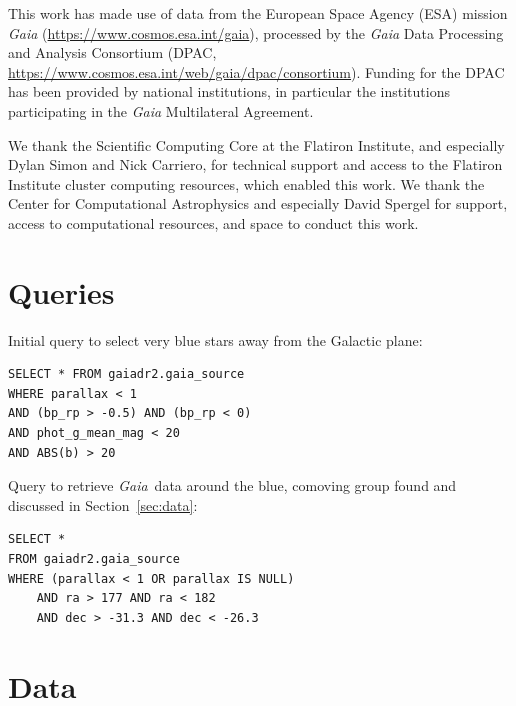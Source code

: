 \documentclass[twocolumn]{aastex62}
\newcommand{\gaia}{\textsl{Gaia}}
\newcommand{\sectionname}{Section}
\begin{document}
This work has made use of data from the European Space Agency (ESA)
mission {\it Gaia} (\url{https://www.cosmos.esa.int/gaia}), processed by
the {\it Gaia} Data Processing and Analysis Consortium (DPAC,
\url{https://www.cosmos.esa.int/web/gaia/dpac/consortium}). Funding
for the DPAC has been provided by national institutions, in particular
the institutions participating in the {\it Gaia} Multilateral Agreement.

We thank the Scientific Computing Core at the Flatiron Institute, and especially Dylan Simon and Nick Carriero, for technical support and access to the Flatiron Institute cluster computing resources, which enabled this work.
We thank the Center for Computational Astrophysics and especially David Spergel for support, access to computational resources, and space to conduct this work.

\clearpage

\appendix

\section{Queries}
\label{sec:queries}

Initial query to select very blue stars away from the Galactic plane:
\begin{verbatim}
SELECT * FROM gaiadr2.gaia_source
WHERE parallax < 1
AND (bp_rp > -0.5) AND (bp_rp < 0)
AND phot_g_mean_mag < 20
AND ABS(b) > 20
\end{verbatim}

Query to retrieve \gaia\ data around the blue, comoving group found and discussed in \sectionname~\ref{sec:data}:
\begin{verbatim}
SELECT *
FROM gaiadr2.gaia_source
WHERE (parallax < 1 OR parallax IS NULL)
    AND ra > 177 AND ra < 182
    AND dec > -31.3 AND dec < -26.3
\end{verbatim}

\section{Data}
\label{sec:datatables}
\end{document}
